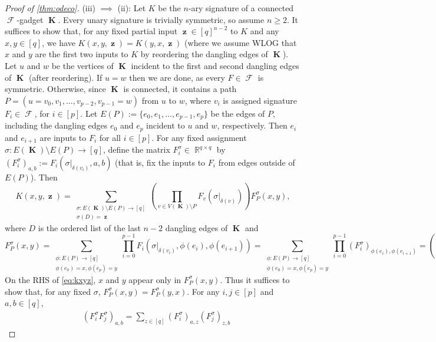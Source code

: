 \documentclass{article}
\theoremstyle{remark}
\theoremstyle{definition}
\DeclareMathOperator{\rr}{\mathbb{R}}
\DeclareMathOperator{\vk}{\mathbf{K}}
\DeclareMathOperator{\vz}{\mathbf{z}}
\DeclareMathOperator{\fc}{\mathcal{F}}
\begin{document}
\begin{proof}[Proof of \autoref{thm:odeco}]
    (iii) $\implies$ (ii): Let $K$ be the $n$-ary signature of a connected $\fc$-gadget $\vk$.
    Every unary signature is trivially symmetric, so assume $n \geq 2$. It suffices to show that,
    for any fixed partial input $\vz \in [q]^{n-2}$ to $K$ and any $x,y \in [q]$, we have
    $K(x,y,\vz) = K(y,x,\vz)$ (where we assume WLOG that $x$ and $y$ are the first two inputs to $K$
    by reordering the dangling edges of $\vk$). Let $u$ and $w$ be the vertices of $\vk$ incident to
    the first and second dangling edges of $\vk$ (after reordering).
    If $u = w$ then we are done, as every $F \in \fc$ is symmetric.
    Otherwise, since $\vk$ is connected, it contains a path 
    $P = (u = v_0,v_1,\ldots,v_{p-2},v_{p-1} = w)$ 
    from $u$ to $w$, where $v_i$ is assigned signature $F_i \in \fc$, for $i \in [p]$.
    Let $E(P) := \{e_0,e_1,\ldots,e_{p-1},e_p\}$ be the edges of $P$, including the dangling edges
    $e_0$ and $e_p$ incident to $u$ and $w$, respectively.
    Then $e_i$ and $e_{i+1}$ are inputs to $F_i$ for all $i \in [p]$. 
    For any fixed assignment $\sigma: E(\vk) \setminus E(P) \to [q]$,
    define the matrix $F^\sigma_i \in \rr^{q \times q}$ by 
    $(F^\sigma_i)_{a,b} := F_i(\sigma|_{\delta(v_i)},a,b)$ 
    (that is, fix the inputs to $F_i$ from edges outside of $E(P)$). Then
    \begin{equation}
        K(x,y,\vz) = 
        \sum_{\substack{\sigma: E(\vk) \setminus E(P) \to [q] \\ \sigma(D) = \vz}} 
        \left(\prod_{v \in V(\vk) \setminus P} F_v(\sigma|_{\delta(v)})\right) 
        F^\sigma_P(x,y),
        \label{eq:kxyz}
    \end{equation}
    where $D$ is the ordered list of the last $n-2$ dangling edges of $\vk$ and
    \[
        F^\sigma_P(x,y) =
        \sum_{\substack{\phi: E(P) \to [q] \\ \phi(e_0)=x,\phi(e_p)=y}} 
            \prod_{i=0}^{p-1} F_i(\sigma|_{\delta(v_i)}, \phi(e_i),\phi(e_{i+1}))
        = \sum_{\substack{\phi: E(P) \to [q] \\ \phi(e_0)=x,\phi(e_p)=y}} 
        \prod_{i=0}^{p-1} (F^\sigma_i)_{\phi(e_i),\phi(e_{i+1})}
        = \left(\prod_{i=0}^{p-1} F^\sigma_i\right)_{x,y}.
    \]
    On the RHS of \eqref{eq:kxyz}, $x$ and $y$
    appear only in $F_P^\sigma(x,y)$. Thus it suffices to show that, for any fixed $\sigma$,
    $F^\sigma_P(x,y) = F^\sigma_P(y,x)$. For any $i,j \in [p]$ and $a,b \in [q]$,
    \begin{align*}
        &(F_i^\sigma F_j^\sigma)_{a,b} = \sum_{z \in [q]} (F_i^\sigma)_{a,z} (F_j^\sigma)_{z,b}

\end{align*}
\end{proof}
\end{document}
